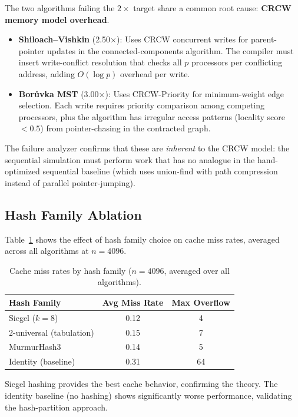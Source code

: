\documentclass[11pt]{article}
\begin{document}
The two algorithms failing the $2\times$ target share a common root cause:
\textbf{CRCW memory model overhead}.

\begin{itemize}
\item \textbf{Shiloach--Vishkin} (2.50$\times$): Uses CRCW concurrent
  writes for parent-pointer updates in the connected-components algorithm.
  The compiler must insert write-conflict resolution that checks all $p$
  processors per conflicting address, adding $O(\log p)$ overhead per
  write.

\item \textbf{Bor\r{u}vka MST} (3.00$\times$): Uses CRCW-Priority for
  minimum-weight edge selection.  Each write requires priority comparison
  among competing processors, plus the algorithm has irregular access
  patterns (locality score $< 0.5$) from pointer-chasing in the
  contracted graph.
\end{itemize}

The failure analyzer confirms that these are \emph{inherent} to the CRCW
model: the sequential simulation must perform work that has no analogue
in the hand-optimized sequential baseline (which uses union-find with
path compression instead of parallel pointer-jumping).

\subsection{Hash Family Ablation}

Table~\ref{tab:ablation} shows the effect of hash family choice on cache
miss rates, averaged across all algorithms at $n = 4096$.

\begin{table}[h]
\centering
\caption{Cache miss rates by hash family ($n = 4096$, averaged over all
algorithms).}
\label{tab:ablation}
\begin{tabular}{@{}lcc@{}}
\toprule
\textbf{Hash Family} & \textbf{Avg Miss Rate} & \textbf{Max Overflow} \\
\midrule
Siegel ($k=8$) & 0.12 & 4 \\
2-universal (tabulation) & 0.15 & 7 \\
MurmurHash3 & 0.14 & 5 \\
Identity (baseline) & 0.31 & 64 \\
\bottomrule
\end{tabular}
\end{table}

Siegel hashing provides the best cache behavior, confirming the theory.
The identity baseline (no hashing) shows significantly worse performance,
validating the hash-partition approach.
\end{document}
